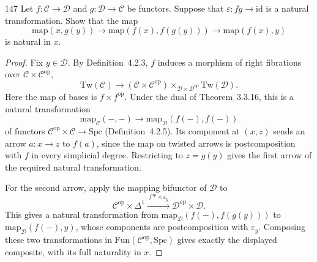 \begin{exercise}{147}
Let $f\colon \mathcal{C}\to \mathcal{D}$ and $g\colon \mathcal{D}\to \mathcal{C}$ be functors. Suppose that $\varepsilon\colon fg\to\mathrm{id}$ is a
natural transformation. Show that the map
\[
 \mathrm{map}(x,g(y))\to\mathrm{map}(f(x),f(g(y)))\to\mathrm{map}(f(x),y)
\]
is natural in $x$.

\begin{proof}
Fix $y\in \mathcal{D}$. By Definition~4.2.3, $f$ induces a morphism of right
fibrations over $\mathcal{C}\times \mathcal{C}^{\mathrm{op}}$,
\[
 \mathrm{Tw}(\mathcal{C})\longrightarrow
 (\mathcal{C}\times \mathcal{C}^{\mathrm{op}})
 \times_{\mathcal{D}\times \mathcal{D}^{\mathrm{op}}}\mathrm{Tw}(\mathcal{D}).
\]
Here the map of bases is $f\times f^{\mathrm{op}}$.
Under the dual of Theorem~3.3.16, this is a natural transformation
\[
 \mathrm{map}_{\mathcal{C}}(-,-)\longrightarrow\mathrm{map}_{\mathcal{D}}(f(-),f(-))
\]
of functors $\mathcal{C}^{\mathrm{op}}\times \mathcal{C}\to\mathrm{Spc}$
(Definition~4.2.5). Its component at $(x,z)$ sends an arrow
$a\colon x\to z$ to $f(a)$, since the map on twisted arrows is
postcomposition with $f$ in every simplicial degree.
Restricting to $z=g(y)$ gives the first arrow of the required
natural transformation.

For the second arrow, apply the mapping bifunctor of $\mathcal{D}$ to
\[
 \mathcal{C}^{\mathrm{op}}\times\Delta^1
 \xrightarrow{\ f^{\mathrm{op}}\times\varepsilon_y\ }
 \mathcal{D}^{\mathrm{op}}\times \mathcal{D}.
\]
\begingroup
\setlength{\emergencystretch}{2em}
This gives a natural transformation from
$\mathrm{map}_{\mathcal{D}}(f(-),f(g(y)))$ to $\mathrm{map}_{\mathcal{D}}(f(-),y)$,
whose components are postcomposition with $\varepsilon_y$.
Composing these two transformations in
$\mathrm{Fun}(\mathcal{C}^{\mathrm{op}},\mathrm{Spc})$ gives exactly the displayed
composite, with its full naturality in $x$.
\par
\endgroup
\end{proof}
\end{exercise}
